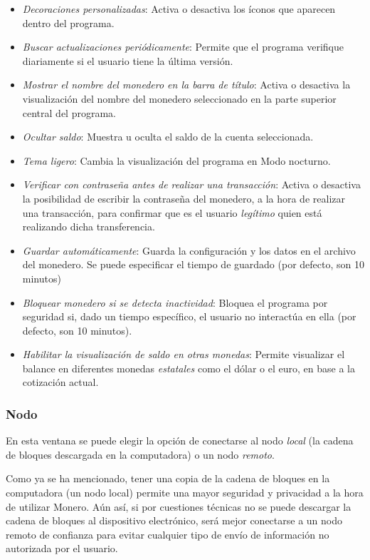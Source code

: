 \documentclass[12pt,a4paper,twoside]{book}
\begin{document}
\begin{itemize}
\item \textit{Decoraciones personalizadas}: Activa o desactiva los íconos que aparecen dentro del programa.
\item \textit{Buscar actualizaciones periódicamente}: Permite que el programa verifique diariamente si el usuario tiene la última versión.
\item \textit{Mostrar el nombre del monedero en la barra de título}: Activa o desactiva la visualización del nombre del monedero seleccionado en la parte superior central del programa.
\item \textit{Ocultar saldo}: Muestra u oculta el saldo de la cuenta seleccionada.
\item \textit{Tema ligero}: Cambia la visualización del programa en Modo nocturno.
\item \textit{Verificar con contraseña antes de realizar una transacción}: Activa o desactiva la posibilidad de escribir la contraseña del monedero, a la hora de realizar una transacción, para confirmar que es el usuario \textit{legítimo} quien está realizando dicha transferencia.
\item \textit{Guardar automáticamente}: Guarda la configuración y los datos en el archivo del monedero. Se puede especificar el tiempo de guardado (por defecto, son 10 minutos)
\item \textit{Bloquear monedero si se detecta inactividad}: Bloquea el programa por seguridad si, dado un tiempo específico, el usuario no interactúa en ella (por defecto, son 10 minutos).
\item \textit{Habilitar la visualización de saldo en otras monedas}: Permite visualizar el balance en diferentes monedas \textit{estatales} como el dólar o el euro, en base a la cotización actual.
\end{itemize}

\subsubsection{Nodo}
En esta ventana se puede elegir la opción de conectarse al nodo \textit{local} (la cadena de bloques descargada en la computadora) o un nodo \textit{remoto}.

Como ya se ha mencionado, tener una copia de la cadena de bloques en la computadora (un nodo local) permite una mayor seguridad y privacidad a la hora de utilizar Monero. Aún así, si por cuestiones técnicas no se puede descargar la cadena de bloques al dispositivo electrónico, será mejor conectarse a un nodo remoto de confianza para evitar cualquier tipo de envío de información no autorizada por el usuario.
\end{document}
